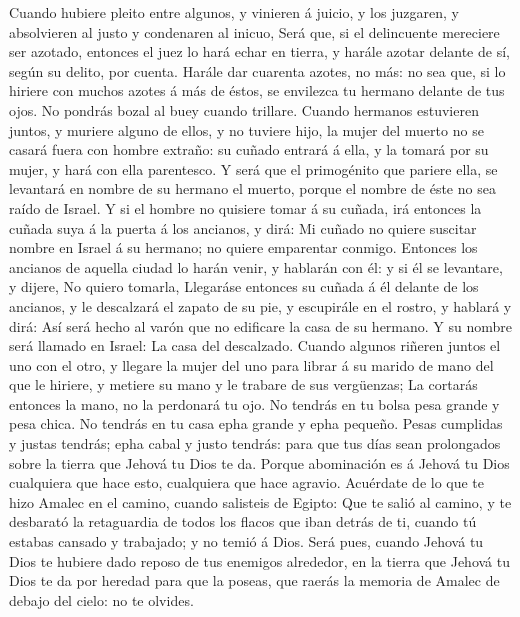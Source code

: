  Cuando hubiere pleito entre algunos, y vinieren á juicio, y
los juzgaren, y absolvieren al justo y condenaren al inicuo,
 Será que, si el delincuente mereciere ser azotado, entonces
el juez lo hará echar en tierra, y harále azotar delante de sí, según su
delito, por cuenta.  Harále dar cuarenta azotes, no más: no
sea que, si lo hiriere con muchos azotes á más de éstos, se envilezca tu
hermano delante de tus ojos.  No pondrás bozal al buey
cuando trillare.  Cuando hermanos estuvieren juntos, y
muriere alguno de ellos, y no tuviere hijo, la mujer del muerto no se
casará fuera con hombre extraño: su cuñado entrará á ella, y la tomará
por su mujer, y hará con ella parentesco.  Y será que el
primogénito que pariere ella, se levantará en nombre de su hermano el
muerto, porque el nombre de éste no sea raído de Israel.  Y
si el hombre no quisiere tomar á su cuñada, irá entonces la cuñada suya
á la puerta á los ancianos, y dirá: Mi cuñado no quiere suscitar nombre
en Israel á su hermano; no quiere emparentar conmigo. 
Entonces los ancianos de aquella ciudad lo harán venir, y hablarán con
él: y si él se levantare, y dijere, No quiero tomarla, 
Llegaráse entonces su cuñada á él delante de los ancianos, y le
descalzará el zapato de su pie, y escupirále en el rostro, y hablará y
dirá: Así será hecho al varón que no edificare la casa de su hermano.
 Y su nombre será llamado en Israel: La casa del
descalzado.  Cuando algunos riñeren juntos el uno con el
otro, y llegare la mujer del uno para librar á su marido de mano del que
le hiriere, y metiere su mano y le trabare de sus vergüenzas;
 La cortarás entonces la mano, no la perdonará tu ojo.
 No tendrás en tu bolsa pesa grande y pesa chica.
 No tendrás en tu casa epha grande y epha pequeño.
 Pesas cumplidas y justas tendrás; epha cabal y justo
tendrás: para que tus días sean prolongados sobre la tierra que Jehová
tu Dios te da.  Porque abominación es á Jehová tu Dios
cualquiera que hace esto, cualquiera que hace agravio. 
Acuérdate de lo que te hizo Amalec en el camino, cuando salisteis de
Egipto:  Que te salió al camino, y te desbarató la
retaguardia de todos los flacos que iban detrás de ti, cuando tú estabas
cansado y trabajado; y no temió á Dios.  Será pues, cuando
Jehová tu Dios te hubiere dado reposo de tus enemigos alrededor, en la
tierra que Jehová tu Dios te da por heredad para que la poseas, que
raerás la memoria de Amalec de debajo del cielo: no te olvides.

